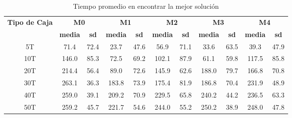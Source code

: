 \begin{table}[H]
    \centering
    \caption{Tiempo promedio en encontrar la mejor solución}
    \label{tab:tiempo}
    \begin{tabular}{|c|c|c|c|c|c|c|c|c|c|c|}
        \hline
        \multirow{2}{*}{\textbf{Tipo de Caja}} & \multicolumn{2}{c|}{\textbf{M0}} & \multicolumn{2}{c|}{\textbf{M1}} & \multicolumn{2}{c|}{\textbf{M2}} & \multicolumn{2}{c|}{\textbf{M3}} & \multicolumn{2}{c|}{\textbf{M4}}                                                                             \\ \cline{2-11}
                                               & \textbf{media}                   & \textbf{sd}                      & \textbf{media}                   & \textbf{sd}                      & \textbf{media}                   & \textbf{sd} & \textbf{media} & \textbf{sd} & \textbf{media} & \textbf{sd} \\ \hline
        5T                                     & 71.4                             & 72.4                             & 23.7                             & 47.6                             & 56.9                             & 71.1        & 33.6           & 63.5        & 39.3           & 47.9        \\ \hline
        10T                                    & 146.0                            & 85.3                             & 72.5                             & 69.2                             & 102.1                            & 87.9        & 61.1           & 59.8        & 117.5          & 85.8        \\ \hline
        20T                                    & 214.4                            & 56.4                             & 89.0                             & 72.6                             & 145.9                            & 62.6        & 188.0          & 79.7        & 166.8          & 70.8        \\ \hline
        30T                                    & 263.1                            & 36.3                             & 183.8                            & 73.9                             & 175.4                            & 81.9        & 186.8          & 70.4        & 231.9          & 48.9        \\ \hline
        40T                                    & 259.0                            & 39.1                             & 209.2                            & 70.9                             & 229.5                            & 65.8        & 240.2          & 44.2        & 236.5          & 63.3        \\ \hline
        50T                                    & 259.2                            & 45.7                             & 221.7                            & 54.6                             & 244.0                            & 55.2        & 250.2          & 38.9        & 248.0          & 47.8        \\ \hline
    \end{tabular}
\end{table}

